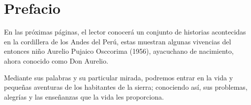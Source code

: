 \cleardoublepage
\newpage
\thispagestyle{empty}
\vfill


\chapter*{Prefacio} %

En las próximas páginas, el lector conocerá un conjunto de historias acontecidas en la cordillera de los Andes del Perú, estas muestran algunas vivencias del entonces niño Aurelio Pujaico Osccorima (1956), %
ayacuchano de nacimiento,
ahora conocido como Don Aurelio.

Mediante sus palabras y su particular mirada, podremos entrar en la vida y pequeñas aventuras de los habitantes de la sierra; conociendo así, sus problemas, alegrías y las enseñanzas que la vida les proporciona.
\vfill

\newpage
\thispagestyle{empty}
